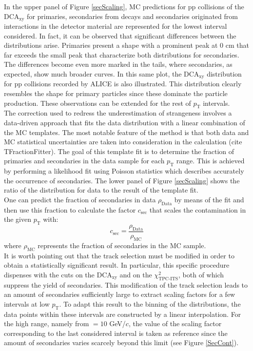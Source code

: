 \documentclass[12pt,a4paper]{report}
\begin{document}
In the upper panel of Figure \ref{secScaling}, MC predictions for pp collisions of the DCA$_{\text{xy}}$ for primaries, secondaries from decays and secondaries originated from interactions in the detector material are represented for the lowest \pt interval considered. In fact, it can be observed that significant differences between the distributions arise. Primaries present a shape with a prominent peak at $0$ cm that far exceeds the small peak that characterize both distributions for secondaries. The differences become even more marked in the tails, where secondaries, as expected, show much broader curves. In this same plot, the DCA$_{\text{xy}}$ distribution for pp collisions recorded by ALICE is also illustrated. This distribution clearly resembles the shape for primary particles since these dominate the particle production. These observations can be extended for the rest of $p_\text{T}$ intervals. \\
The correction used to redress the underestimation of strangeness involves a data-driven approach that fits the data distribution with a linear combination of the MC templates. The most notable feature of the method is that both data and MC statistical uncertainties are taken into consideration in the calculation (cite TFractionFitter). The goal of this template fit is to determine the fraction of primaries and secondaries in the data sample for each $p_\text{T}$ range. This is achieved by performing a likelihood fit using Poisson statistics which describes accurately the occurrence of secondaries. The lower panel of Figure \ref{secScaling} shows the ratio of the distribution for data to the result of the template fit. \\
One can predict the fraction of secondaries in data $\rho_\text{Data}$ by means of the fit and then use this fraction to calculate the factor $c_\text{sec}$ that scales the contamination in the given $p_\text{T}$ with:
\begin{equation}
c_\text{sec} = \dfrac{\rho_\text{Data}}{\rho_\text{MC}}
\end{equation}
where $\rho_\text{MC}$ represents the fraction of secondaries in the MC sample.\\
It is worth pointing out that the track selection must be modified in order to obtain a statistically significant result. In particular, this specific procedure dispenses with the cuts on the DCA$_\text{xy}$ and on the  $\chi^2_\text{TPC-ITS}$, both of which suppress the yield of secondaries. This modification of the track selection leads to an amount of secondaries sufficiently large to extract scaling factors for a few intervals at low $p_\text{T}$. To adapt this result to the binning of the \pt distributions, the data points within these intervals are constructed by a linear interpolation. For the high \pt range, namely from \pt $= 10$ GeV/$c$, the value of the scaling factor corresponding to the last considered \pt interval is taken as reference since the amount of secondaries varies scarcely beyond this limit (see Figure \ref{SecCont}).\\
\end{document}
